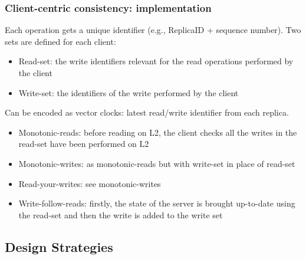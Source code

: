\documentclass[10pt,a4paper]{article}
\begin{document}
\subsubsection{Client-centric consistency: implementation}
Each operation gets a unique identifier (e.g., ReplicaID + sequence number). Two sets are defined for each client:
\begin{itemize}
	\item Read-set: the write identifiers relevant for the read operations performed by the client
	\item Write-set: the identifiers of the write performed by the client
\end{itemize}
Can be encoded as vector clocks: latest read/write identifier from each replica.
\begin{itemize}
	\item Monotonic-reads: before reading on L2, the client checks all the writes in the read-set have been performed on L2
	\item Monotonic-writes: as monotonic-reads but with write-set in place of read-set
	\item Read-your-writes: see monotonic-writes
	\item Write-follow-reads: firstly, the state of the server is brought up-to-date using the read-set and then the write is added to the write set
\end{itemize}
\subsection{Design Strategies}
\end{document}
